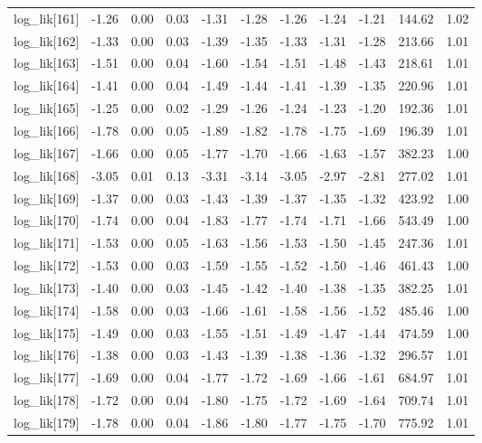 \begin{table}[ht]
\begin{tabular}{rrrrrrrrrrr}
  log\_lik[161] & -1.26 & 0.00 & 0.03 & -1.31 & -1.28 & -1.26 & -1.24 & -1.21 & 144.62 & 1.02 \\ 
  log\_lik[162] & -1.33 & 0.00 & 0.03 & -1.39 & -1.35 & -1.33 & -1.31 & -1.28 & 213.66 & 1.01 \\ 
  log\_lik[163] & -1.51 & 0.00 & 0.04 & -1.60 & -1.54 & -1.51 & -1.48 & -1.43 & 218.61 & 1.01 \\ 
  log\_lik[164] & -1.41 & 0.00 & 0.04 & -1.49 & -1.44 & -1.41 & -1.39 & -1.35 & 220.96 & 1.01 \\ 
  log\_lik[165] & -1.25 & 0.00 & 0.02 & -1.29 & -1.26 & -1.24 & -1.23 & -1.20 & 192.36 & 1.01 \\ 
  log\_lik[166] & -1.78 & 0.00 & 0.05 & -1.89 & -1.82 & -1.78 & -1.75 & -1.69 & 196.39 & 1.01 \\ 
  log\_lik[167] & -1.66 & 0.00 & 0.05 & -1.77 & -1.70 & -1.66 & -1.63 & -1.57 & 382.23 & 1.00 \\ 
  log\_lik[168] & -3.05 & 0.01 & 0.13 & -3.31 & -3.14 & -3.05 & -2.97 & -2.81 & 277.02 & 1.01 \\ 
  log\_lik[169] & -1.37 & 0.00 & 0.03 & -1.43 & -1.39 & -1.37 & -1.35 & -1.32 & 423.92 & 1.00 \\ 
  log\_lik[170] & -1.74 & 0.00 & 0.04 & -1.83 & -1.77 & -1.74 & -1.71 & -1.66 & 543.49 & 1.00 \\ 
  log\_lik[171] & -1.53 & 0.00 & 0.05 & -1.63 & -1.56 & -1.53 & -1.50 & -1.45 & 247.36 & 1.01 \\ 
  log\_lik[172] & -1.53 & 0.00 & 0.03 & -1.59 & -1.55 & -1.52 & -1.50 & -1.46 & 461.43 & 1.00 \\ 
  log\_lik[173] & -1.40 & 0.00 & 0.03 & -1.45 & -1.42 & -1.40 & -1.38 & -1.35 & 382.25 & 1.01 \\ 
  log\_lik[174] & -1.58 & 0.00 & 0.03 & -1.66 & -1.61 & -1.58 & -1.56 & -1.52 & 485.46 & 1.00 \\ 
  log\_lik[175] & -1.49 & 0.00 & 0.03 & -1.55 & -1.51 & -1.49 & -1.47 & -1.44 & 474.59 & 1.00 \\ 
  log\_lik[176] & -1.38 & 0.00 & 0.03 & -1.43 & -1.39 & -1.38 & -1.36 & -1.32 & 296.57 & 1.01 \\ 
  log\_lik[177] & -1.69 & 0.00 & 0.04 & -1.77 & -1.72 & -1.69 & -1.66 & -1.61 & 684.97 & 1.01 \\ 
  log\_lik[178] & -1.72 & 0.00 & 0.04 & -1.80 & -1.75 & -1.72 & -1.69 & -1.64 & 709.74 & 1.01 \\ 
  log\_lik[179] & -1.78 & 0.00 & 0.04 & -1.86 & -1.80 & -1.77 & -1.75 & -1.70 & 775.92 & 1.01 \\ 

\end{tabular}
\end{table}
